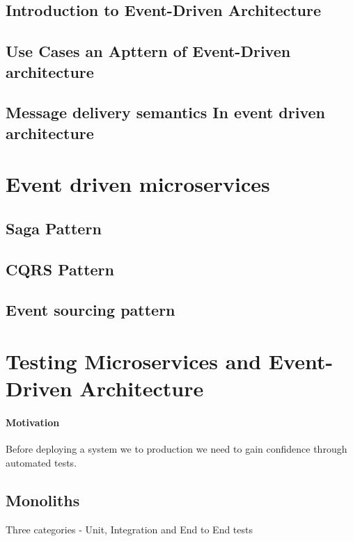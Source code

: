 \documentclass[a4paper, 11pt]{book}
\begin{document}
    \subsection{Introduction to Event-Driven Architecture}

    \subsection{Use Cases an Apttern of Event-Driven architecture}

    \subsection{Message delivery semantics In event driven architecture}


    \section{Event driven microservices}

    \subsection{Saga Pattern}

    \subsection{CQRS Pattern}

    \subsection{Event sourcing pattern}


    \section{Testing Microservices and Event-Driven Architecture}

    \paragraph{Motivation} Before deploying a system we to production we need to gain confidence through automated tests.

    \subsection{Monoliths}
    Three categories - Unit, Integration and End to End tests
\end{document}
